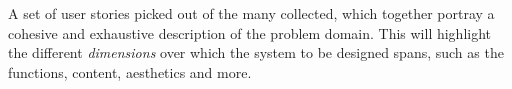 \begin{definition} \label{def:scenario_corpus} 
  A set of user stories picked out of the many collected, which together portray a cohesive and exhaustive description of the problem domain. This will highlight the different \emph{dimensions} over which the system to be designed spans, such as the functions, content, aesthetics and more. \cite[p. 67-68]{benyon_14}
\end{definition}